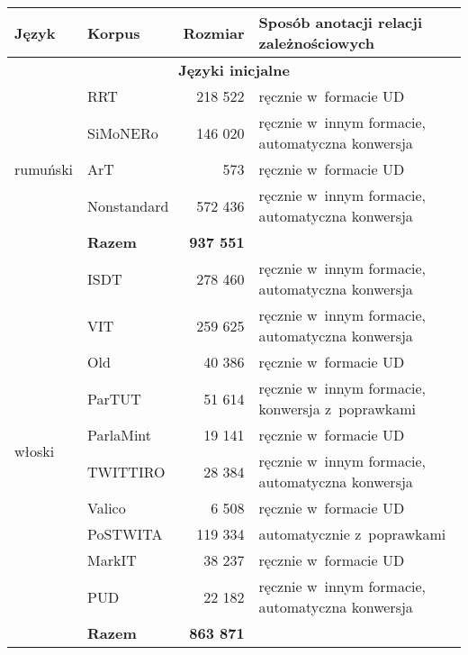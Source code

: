 \begin{table}[!h]
  \centering
  \small
    \begin{tabular}{llrl}
    \toprule
        Język & Korpus & Rozmiar & Sposób anotacji relacji zależnościowych \\ 
    \midrule
    		\multicolumn{4}{c}{\textbf{Języki inicjalne}} \\
    \midrule
        
        \multirow{5}{*}{rumuński} & RRT & 218 522 & ręcznie w~formacie UD \\
        ~ & SiMoNERo & 146 020 & ręcznie w~innym formacie, automatyczna konwersja \\
        ~ & ArT & 573 & ręcznie w~formacie UD \\
        ~ & Nonstandard & 572 436 & ręcznie w~innym formacie, automatyczna konwersja \\ 
        ~ & \textbf{Razem} & \textbf{937 551} \\ \midrule
        
        \multirow{11}{*}{włoski} & ISDT & 278 460 & ręcznie w~innym formacie, automatyczna konwersja \\
        ~ & VIT & 259 625 & ręcznie w~innym formacie, automatyczna konwersja \\
        ~ & Old & 40 386 & ręcznie w~formacie UD \\
        ~ & ParTUT & 51 614 & ręcznie w~innym formacie, konwersja z~poprawkami \\
        ~ & ParlaMint & 19 141 & ręcznie w~formacie UD \\
        ~ & TWITTIRO & 28 384 & ręcznie w~innym formacie, automatyczna konwersja \\
        ~ & Valico & 6 508 & ręcznie w~formacie UD \\
        ~ & PoSTWITA & 119 334 & automatycznie z~poprawkami \\
        ~ & MarkIT & 38 237 & ręcznie w~formacie UD \\
        ~ & PUD & 22 182 & ręcznie w~innym formacie, automatyczna konwersja \\ 
        ~ & \textbf{Razem} & \textbf{863 871} \\


\end{tabular}
\end{table}
